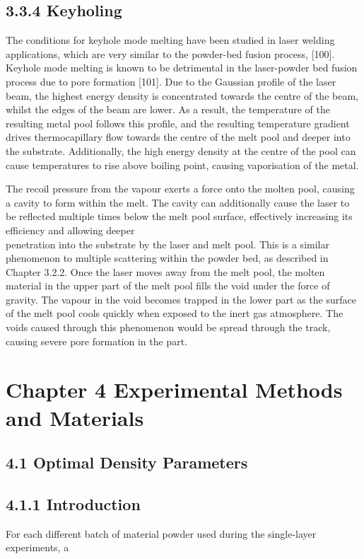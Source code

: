 \documentclass[10pt]{article}
\begin{document}
\subsection*{3.3.4 Keyholing}
The conditions for keyhole mode melting have been studied in laser welding applications, which are very similar to the powder-bed fusion process, [100]. Keyhole mode melting is known to be detrimental in the laser-powder bed fusion process due to pore formation [101]. Due to the Gaussian profile of the laser beam, the highest energy density is concentrated towards the centre of the beam, whilst the edges of the beam are lower. As a result, the temperature of the resulting metal pool follows this profile, and the resulting temperature gradient drives thermocapillary flow towards the centre of the melt pool and deeper into the substrate. Additionally, the high energy density at the centre of the pool can cause temperatures to rise above boiling point, causing vaporisation of the metal.

The recoil pressure from the vapour exerts a force onto the molten pool, causing a cavity to form within the melt. The cavity can additionally cause the laser to be reflected multiple times below the melt pool surface, effectively increasing its efficiency and allowing deeper\\
penetration into the substrate by the laser and melt pool. This is a similar phenomenon to multiple scattering within the powder bed, as described in Chapter 3.2.2. Once the laser moves away from the melt pool, the molten material in the upper part of the melt pool fills the void under the force of gravity. The vapour in the void becomes trapped in the lower part as the surface of the melt pool cools quickly when exposed to the inert gas atmosphere. The voids caused through this phenomenon would be spread through the track, causing severe pore formation in the part.

\section*{Chapter 4 Experimental Methods and Materials}
\subsection*{4.1 Optimal Density Parameters}
\subsection*{4.1.1 Introduction}
For each different batch of material powder used during the single-layer experiments, a
\end{document}

